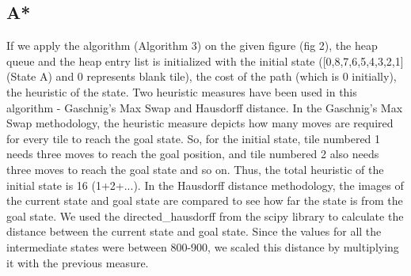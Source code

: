 \documentclass{svproc}
\begin{document}
\subsection{A*}
\noindent If we apply the algorithm (Algorithm 3)  on the given figure (fig 2), the heap queue and the heap entry list is initialized with the initial state ([0,8,7,6,5,4,3,2,1] (State A) and 0 represents blank tile), the cost of the path (which is 0 initially), the heuristic of the state. Two heuristic measures have been used in this algorithm - Gaschnig’s Max Swap and Hausdorff distance. In the Gaschnig’s Max Swap methodology, the heuristic measure depicts how many moves are required for every tile to reach the goal state. So, for the initial state, tile numbered 1 needs three moves to reach the goal position, and tile numbered 2 also needs three moves to reach the goal state and so on. Thus, the total heuristic of the initial state is 16 (1+2+...). In the Hausdorff distance methodology, the images of the current state and goal state are compared to see how far the state is from the goal state. We used the directed\_hausdorff from the scipy library to calculate the distance between the current state and goal state. Since the values for all the intermediate states were between 800-900, we scaled this distance by multiplying it with the previous measure. \\
\end{document}
